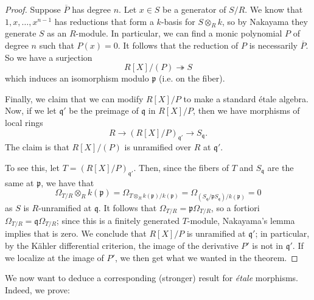 \begin{proof}
Suppose $\overline{P}$ has degree $n$.
Let $x \in S$ be a generator of $S/R$.
We know that $1, x, \dots, x^{n-1}$ has reductions that form a $k$-basis for
$S \otimes_R k$, so by Nakayama they generate $S$ as an $R$-module.
In particular, we can find a monic polynomial $P$ of degree $n$ such that
$P(x) = 0$. 
It follows that the reduction of $P$ is necessarily $\overline{P}$.
So we have a surjection
\[ R[X]/(P) \twoheadrightarrow S  \]
which induces an isomorphism modulo $\mathfrak{p}$ (i.e. on the fiber).

Finally, we claim that we can modify $R[X]/P$ to make a standard \'etale
algebra. Now, 
if we let $\mathfrak{q}'$ be the preimage of $\mathfrak{q}$ in
$R[X]/P$, then we have morphisms of local rings
\[ R \to (R[X]/P)_{\mathfrak{q}'} \to S_{\mathfrak{q}}. \]
The claim is that $R[X]/(P)$ is unramified
over $R$ at $\mathfrak{q}'$.


To see this, let $T = (R[X]/P)_{\mathfrak{q}'}$. Then, since the fibers of $T$ and $S_{\mathfrak{q}}$ are the same at
$\mathfrak{p}$,  we have that
\[ \Omega_{T/R} \otimes_R k(\mathfrak{p}) = \Omega_{T \otimes_R
k(\mathfrak{p})/k(\mathfrak{p})} = 
\Omega_{(S_{\mathfrak{q}}/\mathfrak{p}S_{\mathfrak{q}})/k(\mathfrak{p})} = 0   \]
as $S$ is $R$-unramified at $\mathfrak{q}$.
It follows that $\Omega_{T/R} = \mathfrak{p} \Omega_{T/R}$, so a fortiori
$\Omega_{T/R} = \mathfrak{q} \Omega_{T/R}$; since this is a finitely generated
$T$-module, Nakayama's lemma implies that is zero. 
 We conclude
that $R[X]/P$ is unramified at $\mathfrak{q}'$; in particular, by the
K\"ahler differential criterion, the image of the derivative $P'$ is not in
$\mathfrak{q}'$. If we localize at the image of $P'$, we then get what we
wanted in the theorem.
\end{proof} 

We now want to deduce a corresponding (stronger) result for \emph{\'etale}
morphisms. Indeed, we prove:

